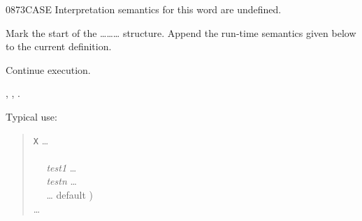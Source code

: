 \begin{worddef}{0873}{CASE}
\interpret
	Interpretation semantics for this word are undefined.

\compile

	Mark the start of the
	\ldots{}\ldots{}\ldots{}
	structure. Append the run-time semantics given below to the
	current definition.

\runtime
	\stack{}{}

	Continue execution.

\see {},
	,
	.

	\begin{defer}
	\rationale %
		Typical use:
		\begin{quote}
			\word{:} \texttt{X} {\ldots} \\
			\tab {} \\
			\tab~~ \emph{test1}  {\ldots}  \\
			\tab~~ \emph{testn}  {\ldots}  \\
			\tab~~ {\ldots}  default ) \\
			\tab {} {\ldots} \\
			\word{;}
		\end{quote}
	\end{defer}
\end{worddef}


